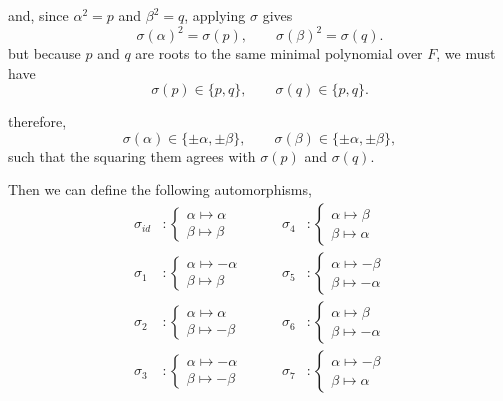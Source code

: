 \documentclass[12pt]{article}
\begin{document}
\begin{solution}
    and, since $\alpha^2 = p$ and $\beta^2 = q$, applying $\sigma$ gives
    \[
    \sigma(\alpha)^2 = \sigma(p),
    \qquad
    \sigma(\beta)^2 = \sigma(q).
    \]
    but because $p$ and $q$ are roots to the same minimal polynomial over $F$, we must have
    \[
    \sigma(p) \in \{p,q\},
    \qquad
    \sigma(q) \in \{p,q\}.
    \]

    therefore,
    \[
    \sigma(\alpha) \in \{\pm \alpha, \pm \beta\},
    \qquad
    \sigma(\beta) \in \{\pm \alpha, \pm \beta\},
    \]
    such that the squaring them agrees with
    $\sigma(p)$ and $\sigma(q)$.
        
    
    Then we can define the following automorphisms, 
   \begin{align*}
        \sigma_{id} &: 
        \begin{cases}
        \alpha \mapsto \alpha \\
        \beta  \mapsto \beta
        \end{cases}
        \qquad
        &
        \sigma_{4} &: 
        \begin{cases}
        \alpha \mapsto \beta \\
        \beta  \mapsto \alpha
        \end{cases}
        \\[1em]
        \sigma_{1} &: 
        \begin{cases}
        \alpha \mapsto -\alpha \\
        \beta  \mapsto \beta
        \end{cases}
        \qquad
        &
        \sigma_{5} &: 
        \begin{cases}
        \alpha \mapsto -\beta \\
        \beta  \mapsto -\alpha
        \end{cases}
        \\[1em]
        \sigma_{2} &: 
        \begin{cases}
        \alpha \mapsto \alpha \\
        \beta  \mapsto -\beta
        \end{cases}
        \qquad
        &
        \sigma_{6} &: 
        \begin{cases}
        \alpha \mapsto \beta \\
        \beta  \mapsto -\alpha
        \end{cases}
        \\[1em]
        \sigma_{3} &: 
        \begin{cases}
        \alpha \mapsto -\alpha \\
        \beta  \mapsto -\beta
        \end{cases}
        \qquad
        &
        \sigma_{7} &: 
        \begin{cases}
        \alpha \mapsto -\beta \\
        \beta  \mapsto \alpha
        \end{cases}
    \end{align*}





\end{solution}
\end{document}
